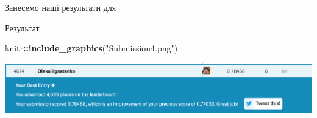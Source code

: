 \documentclass[ignorenonframetext,]{beamer}
\newenvironment{Shaded}{\begin{snugshade}}{\end{snugshade}}
\newcommand{\DataTypeTok}[1]{\textcolor[rgb]{0.13,0.29,0.53}{#1}}
\newcommand{\DecValTok}[1]{\textcolor[rgb]{0.00,0.00,0.81}{#1}}
\newcommand{\KeywordTok}[1]{\textcolor[rgb]{0.13,0.29,0.53}{\textbf{#1}}}
\newcommand{\NormalTok}[1]{#1}
\newcommand{\OperatorTok}[1]{\textcolor[rgb]{0.81,0.36,0.00}{\textbf{#1}}}
\newcommand{\OtherTok}[1]{\textcolor[rgb]{0.56,0.35,0.01}{#1}}
\newcommand{\StringTok}[1]{\textcolor[rgb]{0.31,0.60,0.02}{#1}}
\begin{document}
\begin{frame}[fragile]{Занесемо наші результати для}
\protect\hypertarget{ux437ux430ux43dux435ux441ux435ux43cux43e-ux43dux430ux448ux456-ux440ux435ux437ux443ux43bux44cux442ux430ux442ux438-ux434ux43bux44f}{}

\begin{Shaded}
\end{Shaded}

\end{frame}

\begin{frame}[fragile]{Результат}
\protect\hypertarget{ux440ux435ux437ux443ux43bux44cux442ux430ux442-1}{}

\begin{Shaded}
\begin{Highlighting}[]
\NormalTok{knitr}\OperatorTok{::}\KeywordTok{include_graphics}\NormalTok{(}\StringTok{"Submission4.png"}\NormalTok{)}
\end{Highlighting}
\end{Shaded}

\includegraphics[width=26.36in]{Submission4}

\end{frame}
\end{document}
